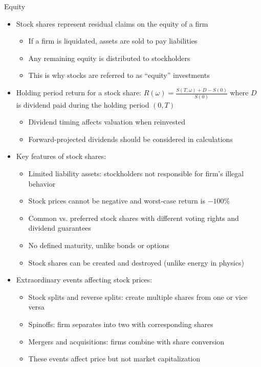 \documentclass[10pt]{beamer}
\newcommand{\ds}{\displaystyle}
\begin{document}
\begin{frame}{Equity}
  \begin{itemize}[<+->]
    \item Stock shares represent residual claims on the equity of a firm
      \begin{itemize}
        \item If a firm is liquidated, assets are sold to pay liabilities
        \item Any remaining equity is distributed to stockholders
        \item This is why stocks are referred to as ``equity'' investments
      \end{itemize}
    \item Holding period return for a stock share: $\ds R(\omega) = \tfrac{S(T, \omega) + D - S(0)}{S(0)}$ where $D$ is dividend paid during the holding period $(0, T)$
      \begin{itemize}
        \item Dividend timing affects valuation when reinvested
        \item Forward-projected dividends should be considered in calculations
      \end{itemize}
    \item Key features of stock shares:
      \begin{itemize}
        \item Limited liability assets: stockholders not responsible for firm's illegal behavior
        \item Stock prices cannot be negative and worst-case return is $-100\%$
        \item Common vs. preferred stock shares with different voting rights and dividend guarantees
        \item No defined maturity, unlike bonds or options
        \item Stock shares can be created and destroyed (unlike energy in physics)
      \end{itemize}
    \item Extraordinary events affecting stock prices:
      \begin{itemize}
        \item Stock splits and reverse splits: create multiple shares from one or vice versa
        \item Spinoffs: firm separates into two with corresponding shares
        \item Mergers and acquisitions: firms combine with share conversion
        \item These events affect price but not market capitalization
      \end{itemize}
  \end{itemize}
\end{frame}
\end{document}
